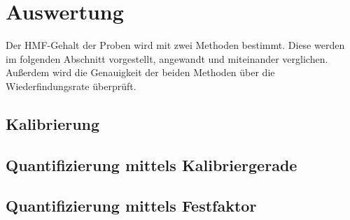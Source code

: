\chapter{Auswertung}
Der HMF-Gehalt der Proben wird mit zwei Methoden bestimmt. Diese werden im folgenden Abschnitt vorgestellt, angewandt und miteinander verglichen. Außerdem wird die Genauigkeit der beiden Methoden über die Wiederfindungsrate überprüft.
\section{Kalibrierung}
\section{Quantifizierung mittels Kalibriergerade}
\section{Quantifizierung mittels Festfaktor}
